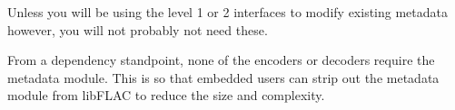 Unless you will be using the level 1 or 2 interfaces to modify existing metadata however, you will not probably not need these.

From a dependency standpoint, none of the encoders or decoders require the metadata module. This is so that embedded users can strip out the metadata module from lib\+F\+L\+AC to reduce the size and complexity. 